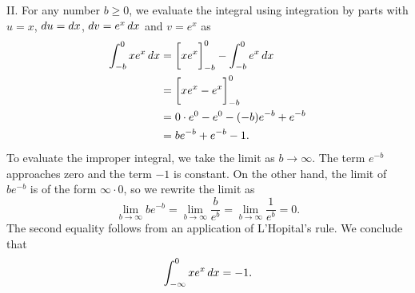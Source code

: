\documentclass[]{ximera}
\begin{document}
\begin{freeResponse}
II. For any number $b \geq 0$, we evaluate the integral using integration by parts with $u=x$, $\mathop{}\!d u = \mathop{}\!d x$, $\mathop{}\!d v = e^x \mathop{}\!d x$ and $v = e^x$ as
\begin{align*}
\int_{-b}^0 x e^x \mathop{}\!d x &= \bigg[ x e^x \bigg]_{-b}^0 - \int_{-b}^0 e^x \mathop{}\!d x \\
&= \bigg[ x e^x - e^x \bigg]_{-b}^0 \\
&= 0 \cdot e^0 - e^0 - (-b)e^{-b} + e^{-b} \\
&= b e^{-b} + e^{-b} - 1.
\end{align*}
To evaluate the improper integral, we take the limit as $b \rightarrow \infty$. The term $e^{-b}$ approaches zero and the term $-1$ is constant. On the other hand, the limit of $b e^{-b}$ is of the form $\infty \cdot 0$, so we rewrite the limit as
$$
\lim_{b\rightarrow \infty}b e^{-b} = \lim_{b\rightarrow \infty} \frac{b}{e^b} = \lim_{b\rightarrow \infty} \frac{1}{e^b} = 0.
$$
The second equality follows from an application of L'Hopital's rule. We conclude that 
$$
\int_{-\infty}^0 x e^x \mathop{}\!d x = -1.
$$
\end{freeResponse}
\end{document}
